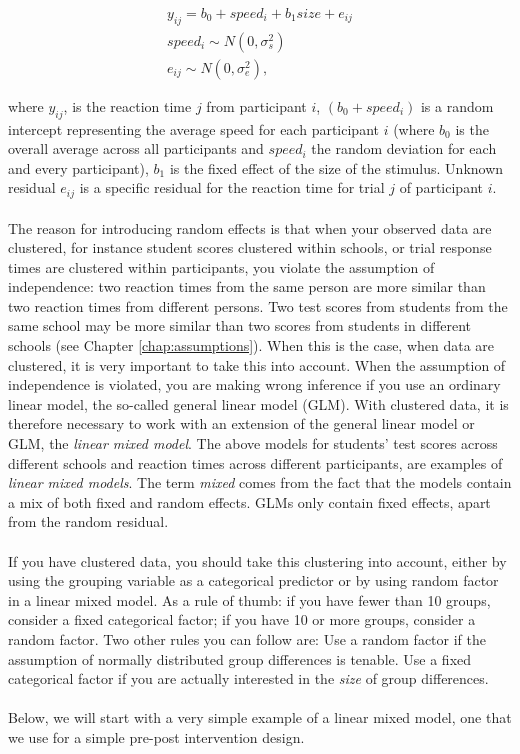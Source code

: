 \documentclass[]{book}\usepackage[]{graphicx}\usepackage[]{color}
\begin{document}
\begin{eqnarray}
y_{ij} = b_0 + speed_i + b_1 size + e_{ij} \\
speed_i \sim N(0, \sigma_s^2)\\
e_{ij} \sim N(0, \sigma_e^2),
\end{eqnarray}

where $y_{ij}$, is the reaction time $j$ from participant $i$, $(b_0 + speed_i)$ is a random intercept representing the average speed for each participant $i$ (where $b_0$ is the overall average across all participants and $speed_i$ the random deviation for each and every participant), $b_1$ is the fixed effect of the size of the stimulus. Unknown residual $e_{ij}$ is a specific residual for the reaction time for trial $j$ of participant $i$.
\\
\\
The reason for introducing random effects is that when your observed data are clustered, for instance student scores clustered within schools, or trial response times are clustered within participants, you violate the assumption of independence: two reaction times from the same person are more similar than two reaction times from different persons. Two test scores from students from the same school may be more similar than two scores from students in different schools (see Chapter \ref{chap:assumptions}). When this is the case, when data are clustered, it is very important to take this into account. When the assumption of independence is violated, you are making wrong inference if you use an ordinary linear model, the so-called general linear model (GLM). With clustered data, it is therefore necessary to work with an extension of the general linear model or GLM, the \textit{linear mixed model}. The above models for students' test scores across different schools and reaction times across different participants, are examples of \textit{linear mixed models}. The term \textit{mixed} comes from the fact that the models contain a mix of both fixed and random effects. GLMs only contain fixed effects, apart from the random residual.
\\
\\
If you have clustered data, you should take this clustering into account, either by using the grouping variable as a categorical predictor or by using random factor in a linear mixed model. As a rule of thumb: if you have fewer than 10 groups, consider a fixed categorical factor; if you have 10 or more groups, consider a random factor. Two other rules you can follow are: Use a random factor if the assumption of normally distributed group differences is tenable. Use a fixed categorical factor if you are actually interested in the \textit{size} of group differences.
\\
\\
Below, we will start with a very simple example of a linear mixed model, one that we use for a simple pre-post intervention design.
\end{document}
